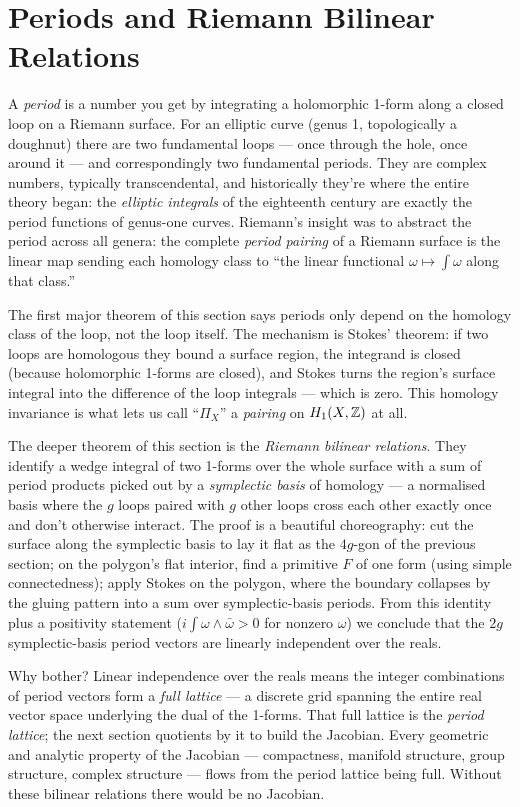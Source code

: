 \section{Periods and Riemann Bilinear Relations}
\label{sec:periods}

\begin{layman}
A \emph{period} is a number you get by integrating a holomorphic
1-form along a closed loop on a Riemann surface. For an elliptic
curve (genus 1, topologically a doughnut) there are two
fundamental loops --- once through the hole, once around it --- and
correspondingly two fundamental periods. They are complex numbers,
typically transcendental, and historically they're where the entire
theory began: the \emph{elliptic integrals} of the eighteenth
century are exactly the period functions of genus-one curves.
Riemann's insight was to abstract the period across all genera:
the complete \emph{period pairing} of a Riemann surface is the
linear map sending each homology class to ``the linear functional
\(\omega \mapsto \int \omega\) along that class.''

The first major theorem of this section says periods only depend on
the homology class of the loop, not the loop itself. The mechanism
is Stokes' theorem: if two loops are homologous they bound a
surface region, the integrand is closed (because holomorphic
1-forms are closed), and Stokes turns the region's surface integral
into the difference of the loop integrals --- which is zero. This
homology invariance is what lets us call ``\(\Pi_X\)'' a
\emph{pairing} on \(H_1(X,\mathbb{Z})\) at all.

The deeper theorem of this section is the \emph{Riemann bilinear
relations}. They identify a wedge integral of two 1-forms over the
whole surface with a sum of period products picked out by a
\emph{symplectic basis} of homology --- a normalised basis where the
\(g\) loops paired with \(g\) other loops cross each other exactly
once and don't otherwise interact. The proof is a beautiful
choreography: cut the surface along the symplectic basis to lay it
flat as the \(4g\)-gon of the previous section; on the polygon's
flat interior, find a primitive \(F\) of one form (using simple
connectedness); apply Stokes on the polygon, where the boundary
collapses by the gluing pattern into a sum over symplectic-basis
periods. From this identity plus a positivity statement
(\(i\int \omega \wedge \bar\omega > 0\) for nonzero \(\omega\)) we
conclude that the \(2g\) symplectic-basis period vectors are
linearly independent over the reals.

Why bother? Linear independence over the reals means the integer
combinations of period vectors form a \emph{full lattice} --- a
discrete grid spanning the entire real vector space underlying the
dual of the 1-forms. That full lattice is the \emph{period lattice};
the next section quotients by it to build the Jacobian. Every
geometric and analytic property of the Jacobian --- compactness,
manifold structure, group structure, complex structure --- flows
from the period lattice being full. Without these bilinear
relations there would be no Jacobian.
\end{layman}

